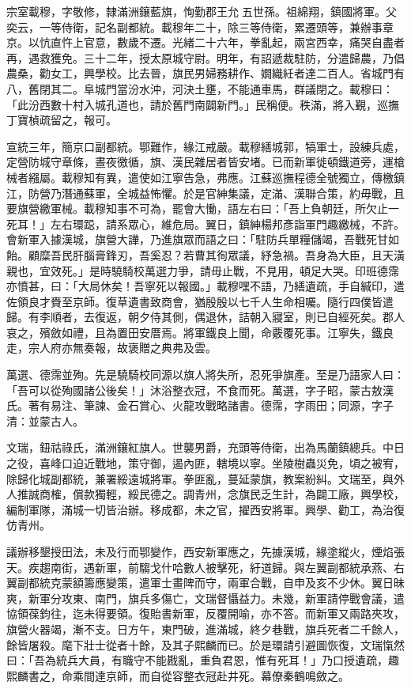 \begin{pinyinscope}
宗室載穆，字敬修，隸滿洲鑲藍旗，恂勤郡王允五世孫。祖綿翔，鎮國將軍。父奕云，一等侍衛，記名副都統。載穆年二十，除三等侍衛，累遷頭等，兼辦事章京。以忼直忤上官意，數歲不遷。光緒二十六年，拳亂起，兩宮西幸，痛哭自盡者再，遇救獲免。三十二年，授太原城守尉。明年，有詔遞裁駐防，分遣歸農，乃倡農桑，勸女工，興學校。比去晉，旗民男婦務耕作、嫺織紝者達二百人。省城門有八，舊閉其二。阜城門當汾水沖，河決土壅，不能通車馬，群議閉之。載穆曰：「此汾西數十村入城孔道也，請於舊門南闢新門。」民稱便。秩滿，將入覲，巡撫丁寶楨疏留之，報可。

宣統三年，簡京口副都統。鄂難作，緣江戒嚴。載穆繕城郭，犒軍士，設練兵處，定營防城守章條，晝夜徼循，旗、漢民雜居者皆安堵。已而新軍徙頓鐵道旁，運槍械者繦屬。載穆知有異，遣使如江寧告急，弗應。江蘇巡撫程德全號獨立，傳檄鎮江，防營乃潛通蘇軍，全城益怖懼。於是官紳集議，定滿、漢聯合策，約毋戰，且要旗營繳軍械。載穆知事不可為，罷會大慟，語左右曰：「吾上負朝廷，所欠止一死耳！」左右環跽，請系眾心，維危局。翼日，鎮紳楊邦彥詣軍門趣繳械，不許。會新軍入據漢城，旗營大譁，乃進旗眾而語之曰：「駐防兵單糧儲竭，吾戰死甘如飴。顧糜吾民肝腦膏鋒刃，吾奚忍？若曹其徇眾議，紓急禍。吾身為大臣，且天潢親也，宜效死。」是時驍騎校萬選力爭，請毋止戰，不見用，頓足大哭。印班德霈亦憤甚，曰：「大局休矣！吾寧死以報國。」載穆嘿不語，乃繕遺疏，手自緘印，遣佐領良才賚至京師。復草遺書致商會，猶殷殷以七千人生命相囑。隨行四僕皆遣歸。有李順者，去復返，朝夕侍其側，偶退休，詰朝入寢室，則已自經死矣。郡人哀之，殯斂如禮，且為置田安厝焉。將軍鐵良上聞，命覈覆死事。江寧失，鐵良走，宗人府亦無奏報，故褒贈之典弗及雲。

萬選、德霈並殉。先是驍騎校同源以旗人將失所，忍死爭旗產。至是乃語家人曰：「吾可以從殉國諸公後矣！」沐浴整衣冠，不食而死。萬選，字子昭，蒙古敖漢氏。著有易注、筆諫、金石賞心、火龍攻戰略諸書。德霈，字雨田；同源，字子清：並蒙古人。

文瑞，鈕祜祿氏，滿洲鑲紅旗人。世襲男爵，充頭等侍衛，出為馬蘭鎮總兵。中日之役，喜峰口迫近戰地，策守御，遏內匪，轄境以寧。坐陵樹蟲災免，頃之被宥，除歸化城副都統，兼署綏遠城將軍。拳匪亂，蔓延蒙旗，教案紛糾。文瑞至，與外人推誠商榷，償款獨輕，綏民德之。調青州，念旗民乏生計，為闢工廠，興學校，編制軍隊，滿城一切皆治辦。移成都，未之官，擢西安將軍。興學、勸工，為治復仿青州。

議辦移墾授田法，未及行而鄂變作，西安新軍應之，先據漢城，緣塗縱火，煙焰張天。疾趨南街，遇新軍，前騶戈什哈數人被擊死，紆道歸。與左翼副都統承燕、右翼副都統克蒙額籌應變策，遣軍士畫陴而守，兩軍合戰，自申及亥不少休。翼日昧爽，新軍分攻東、南門，旗兵多傷亡，文瑞督懾益力。未幾，新軍請停戰會議，遣協領葆鈞往，迄未得要領。復貽書新軍，反覆開喻，亦不答。而新軍又兩路夾攻，旗營火器竭，漸不支。日方午，東門破，進滿城，終夕巷戰，旗兵死者二千餘人，餘皆屠殺。麾下壯士從者十餘，及其子熙麟而已。於是環請引避圖恢復，文瑞愾然曰：「吾為統兵大員，有職守不能戡亂，重負君恩，惟有死耳！」乃口授遺疏，趣熙麟書之，命乘間達京師，而自從容整衣冠赴井死。幕僚秦鶴鳴斂之。


\end{pinyinscope}
